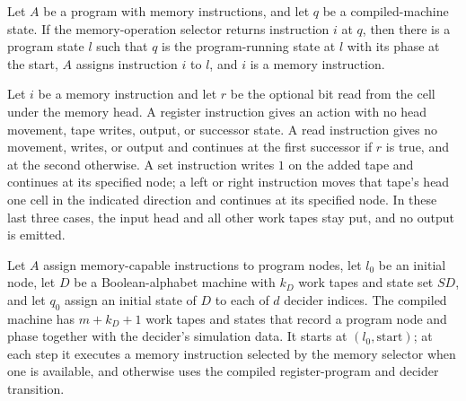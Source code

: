 \begin{lemma}
\label{Complexity.LogProg.mop_spec}
\leanok
{}
Let $A$ be a program with memory instructions, and let $q$ be a compiled-machine state.
If the memory-operation selector returns instruction $i$ at $q$, then there is a program
state $l$ such that $q$ is the program-running state at $l$ with its phase at the start,
$A$ assigns instruction $i$ to $l$, and $i$ is a memory instruction.
\end{lemma}

\begin{definition}
\label{Complexity.LogProg.memAct}
\leanok
{}
Let $i$ be a memory instruction and let $r$ be the optional bit read from the cell under
the memory head. A register instruction gives an action with no head movement, tape
writes, output, or successor state. A read instruction gives no movement, writes, or
output and continues at the first successor if $r$ is true, and at the second otherwise.
A set instruction writes $1$ on the added tape and continues at its specified node; a
left or right instruction moves that tape's head one cell in the indicated direction and
continues at its specified node. In these last three cases, the input head and all other
work tapes stay put, and no output is emitted.
\end{definition}

\begin{definition}
\label{Complexity.LogProg.mcompileTM}
\leanok
{}
Let $A$ assign memory-capable instructions to program nodes, let $l_0$ be an initial
node, let $D$ be a Boolean-alphabet machine with $k_D$ work tapes and state set $SD$,
and let $q_0$ assign an initial state of $D$ to each of $d$ decider indices. The
compiled machine has $m+k_D+1$ work tapes and states that record a program node and
phase together with the decider's simulation data. It starts at $(l_0,\mathrm{start})$;
at each step it executes a memory instruction selected by the memory selector when one
is available, and otherwise uses the compiled register-program and decider transition.
\end{definition}


